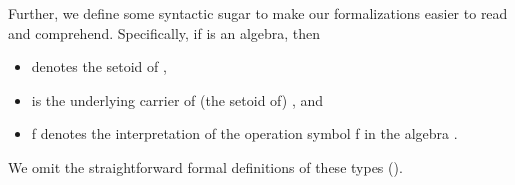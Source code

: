 Further, we define some syntactic sugar to make our formalizations easier to read and comprehend.
Specifically, if  is an algebra, then
\begin{itemize}
\item {} denotes the  setoid of ,
\item {} is the underlying carrier of (the  setoid of) , and
\item \ab f   denotes the interpretation of the operation symbol \ab f in the algebra .
\end{itemize}
\ifshort %
 We omit the straightforward formal definitions of these types (\seemedium).
\else    %
\begin{code}%
\>[0]\AgdaSpace{}%
\<%
\\
\>[0]\AgdaSpace{}%
\AgdaSymbol{:}\AgdaSpace{}%
\AgdaSpace{}%
\AgdaSpace{}%
\AgdaSpace{}%
%
\>[23]\AgdaSpace{}%
\AgdaSpace{}%
\<%
\\
\>[0]\AgdaOperator{\AgdaFunction{𝔻[}}\AgdaSpace{}%
\AgdaSpace{}%
\AgdaOperator{\AgdaFunction{]}}\AgdaSpace{}%
\AgdaSymbol{=}\AgdaSpace{}%
\AgdaSpace{}%
\<%
\\
\>[0]\AgdaSpace{}%
\AgdaSymbol{:}\AgdaSpace{}%
\AgdaSpace{}%
\AgdaSpace{}%
\AgdaSpace{}%
%
\>[23]\AgdaSpace{}%
\<%
\\
\>[0]\AgdaOperator{\AgdaFunction{𝕌[}}\AgdaSpace{}%
\AgdaSpace{}%
\AgdaOperator{\AgdaFunction{]}}\AgdaSpace{}%
\AgdaSymbol{=}\AgdaSpace{}%
\AgdaSpace{}%
\AgdaSymbol{(}\AgdaSpace{}%
\AgdaSymbol{)}\<%
\\
\>[0]\AgdaSpace{}%
\AgdaSymbol{:}\AgdaSpace{}%
\AgdaSymbol{(}\AgdaSpace{}%
\AgdaSymbol{:}\AgdaSpace{}%
\AgdaSpace{}%
\AgdaSpace{}%
\AgdaSymbol{)(}\AgdaSpace{}%
\AgdaSymbol{:}\AgdaSpace{}%
\AgdaSpace{}%

\end{code}
